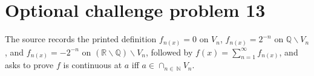\section{Optional challenge problem 13}

The source records the printed definition \(f_{n{(x)}} = 0\) on \(V_{n}\), \(f_{n{(x)}} = 2^{- n}\) on \(\mathbb{Q} \smallsetminus V_{n}\), and \(f_{n{(x)}} = - 2^{- n}\) on \(\left( {\mathbb{R} \smallsetminus \mathbb{Q}} \right) \smallsetminus V_{n}\), followed by \(f(x) = \sum_{n = 1}^{\infty}f_{n{(x)}}\), and asks to prove \(f\) is continuous at \(a\) iff \(a \in \cap_{n \in \ \mathbb{N}}V_{n}\).
